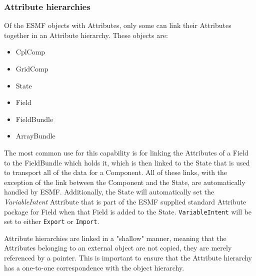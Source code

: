 \subsubsection{Attribute hierarchies}
\label{sec:AttHier}

Of the ESMF objects with Attributes, only some can link their Attributes together in an Attribute hierarchy.  These objects are:

\begin{itemize}
\item CplComp
\item GridComp
\item State
\item Field
\item FieldBundle
\item ArrayBundle
\end{itemize}

The most common use for this capability is for linking the Attributes of a Field to the FieldBundle which holds it, which is then linked to the State that is used to transport all of the data for a Component.  All of these links, with the exception of the link between the Component and the State, are automatically handled by ESMF. Additionally, the State will automatically set the {\it VariableIntent} Attribute that is part of the ESMF supplied standard Attribute package for Field when that Field is added to the State.  {\tt VariableIntent} will be set to either {\tt Export} or {\tt Import}.

Attribute hierarchies are linked in a "shallow" manner, meaning that the Attributes belonging to an external object are not copied, they are merely referenced by a pointer.  This is important to ensure that the Attribute hierarchy has a one-to-one correspondence with the object hierarchy.  
